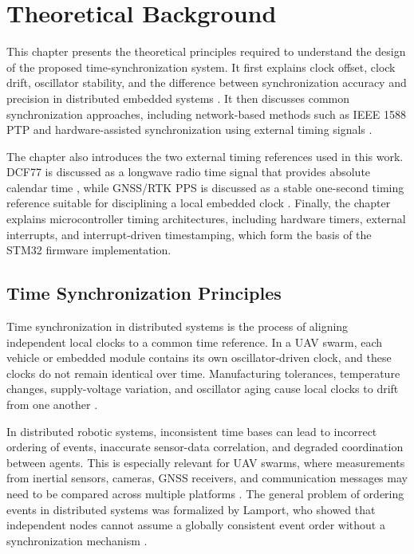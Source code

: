 
\chapter{Theoretical Background\label{chap:theoreticalBackground}}

This chapter presents the theoretical principles required to understand the design of the proposed time-synchronization system. It first explains clock offset, clock drift, oscillator stability, and the difference between synchronization accuracy and precision in distributed embedded systems \cite{kopetz2011realtime,lamport1978time,allan1966statistics,levine2012atomic}. It then discusses common synchronization approaches, including network-based methods such as IEEE 1588 PTP and hardware-assisted synchronization using external timing signals \cite{ieee1588,maroti2004ftsp,cristian1989probabilistic}.

The chapter also introduces the two external timing references used in this work. DCF77 is discussed as a longwave radio time signal that provides absolute calendar time \cite{ptbDcf77}, while GNSS/RTK PPS is discussed as a stable one-second timing reference suitable for disciplining a local embedded clock \cite{r6}. Finally, the chapter explains microcontroller timing architectures, including hardware timers, external interrupts, and interrupt-driven timestamping, which form the basis of the STM32 firmware implementation.

\section{Time Synchronization Principles}

Time synchronization in distributed systems is the process of aligning independent local clocks to a common time reference. In a UAV swarm, each vehicle or embedded module contains its own oscillator-driven clock, and these clocks do not remain identical over time. Manufacturing tolerances, temperature changes, supply-voltage variation, and oscillator aging cause local clocks to drift from one another \cite{kopetz2011realtime,allan1966statistics,levine2012atomic}.

In distributed robotic systems, inconsistent time bases can lead to incorrect ordering of events, inaccurate sensor-data correlation, and degraded coordination between agents. This is especially relevant for UAV swarms, where measurements from inertial sensors, cameras, GNSS receivers, and communication messages may need to be compared across multiple platforms \cite{r1,r2,r7}. The general problem of ordering events in distributed systems was formalized by Lamport, who showed that independent nodes cannot assume a globally consistent event order without a synchronization mechanism \cite{lamport1978time}.

